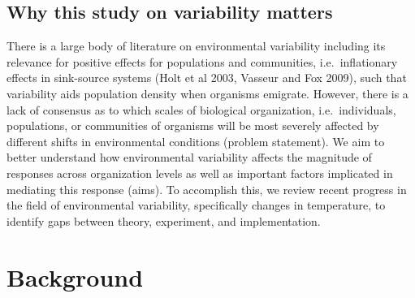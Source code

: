\documentclass[12pt,twoside]{reedthesis}
\begin{document}
\hypertarget{why-this-study-on-variability-matters}{%
\section{Why this study on variability matters}\label{why-this-study-on-variability-matters}}

There is a large body of literature on environmental variability including its relevance for positive effects for populations and communities, i.e.~inflationary effects in sink-source systems (Holt et al 2003, Vasseur and Fox 2009), such that variability aids population density when organisms emigrate. However, there is a lack of consensus as to which scales of biological organization, i.e.~individuals, populations, or communities of organisms will be most severely affected by different shifts in environmental conditions (problem statement). We aim to better understand how environmental variability affects the magnitude of responses across organization levels as well as important factors implicated in mediating this response (aims). To accomplish this, we review recent progress in the field of environmental variability, specifically changes in temperature, to identify gaps between theory, experiment, and implementation.

\hypertarget{background}{%
\chapter*{Background}\label{background}}
\end{document}
